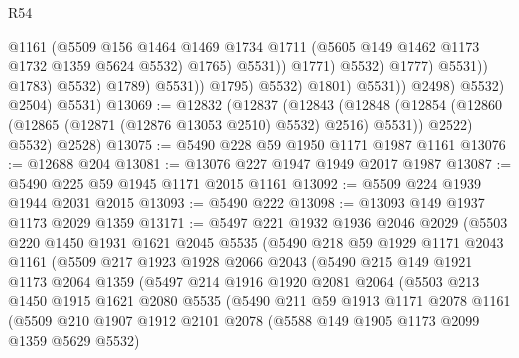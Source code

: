 \begin{lexlean}{R54}
\begin{coremodule}
                                              @1161
                                              (@5509
                                                @156
                                                @1464
                                                @1469
                                                @1734
                                                @1711
                                                (@5605 @149 @1462 @1173 @1732 @1359 @5624 @5532)
                                                @1765)
                                              @5531))
                                          @1771)
                                        @5532)
                                      @1777)
                                    @5531))
                                @1783)
                              @5532)
                            @1789)
                          @5531))
                      @1795)
                    @5532)
                  @1801)
                @5531))
            @2498)
          @5532)
        @2504)
      @5531)
@13069 := @12832
    (@12837
      (@12843
        (@12848 (@12854 (@12860 (@12865 (@12871 (@12876 @13053 @2510) @5532) @2516) @5531)) @2522)
        @5532)
      @2528)
@13075 := @5490 @228 @59 @1950 @1171 @1987 @1161
@13076 := @12688 @204
@13081 := @13076 @227 @1947 @1949 @2017 @1987
@13087 := @5490 @225 @59 @1945 @1171 @2015 @1161
@13092 := @5509 @224 @1939 @1944 @2031 @2015
@13093 := @5490 @222
@13098 := @13093 @149 @1937 @1173 @2029 @1359
@13171 := @5497
    @221
    @1932
    @1936
    @2046
    @2029
    (@5503
      @220
      @1450
      @1931
      @1621
      @2045
      @5535
      (@5490
        @218
        @59
        @1929
        @1171
        @2043
        @1161
        (@5509
          @217
          @1923
          @1928
          @2066
          @2043
          (@5490
            @215
            @149
            @1921
            @1173
            @2064
            @1359
            (@5497
              @214
              @1916
              @1920
              @2081
              @2064
              (@5503
                @213
                @1450
                @1915
                @1621
                @2080
                @5535
                (@5490
                  @211
                  @59
                  @1913
                  @1171
                  @2078
                  @1161
                  (@5509
                    @210
                    @1907
                    @1912
                    @2101
                    @2078
                    (@5588 @149 @1905 @1173 @2099 @1359 @5629 @5532)

\end{coremodule}
\end{lexlean}
